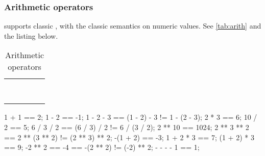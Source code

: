 \newenvironment{operatorTabular}
{
  \begin{tabular}{|*{5}{c|}}
    \hline
    \strong{\whetherHtml{Operator}{Oper.}}
    & \strong{Syntax}
    & \strong{\whetherHtml{Associativity}{Assoc.}}
    & \strong{Semantics}
    & \strong{Equivalence}
    \\
    \hline
  }{%
    \\
    \hline
  \end{tabular}
}

\newenvironment{operatorTable}[3][]
{
  \def\operatorTableLabel{#2}%
  \def\operatorTableCaption{#3}%
  \begin{table}[\floatposh]
    \centering#1%
    \begin{operatorTabular}
    }{%
    \end{operatorTabular}
    \caption{\operatorTableCaption}
    \label{\operatorTableLabel}
  \end{table}
}

\subsubsection{Arithmetic operators}
\label{sec:lang:op:arith}


\us supports classic , with the classic semantics
on numeric values. See \autoref{tab:arith} and the listing below.
\begin{operatorTable}{tab:arith}{Arithmetic operators}
  \operatorexp
  \\\hline
  \operatoruplus\\\operatorumin
  \\\hline
  \operatormult\\\operatordiv\\\operatormod
  \\\hline
  \operatorplus\\\operatorminus
\end{operatorTable}

\begin{urbiassert}
       1 + 1 ==    2;
       1 - 2 ==   -1;  1 - 2 - 3 == (1 - 2) - 3 != 1 - (2 - 3);
       2 * 3 ==    6;
      10 / 2 ==    5;  6 / 3 / 2 == (6 / 3) / 2 != 6 / (3 / 2);
     2 ** 10 == 1024;  2 ** 3 ** 2 == 2 ** (3 ** 2) != (2 ** 3) ** 2;
    -(1 + 2) ==   -3;
   1 + 2 * 3 ==    7;
 (1 + 2) * 3 ==    9;
     -2 ** 2 ==   -4 == -(2 ** 2) != (-2) ** 2;
   - - - - 1 ==    1;
\end{urbiassert}

